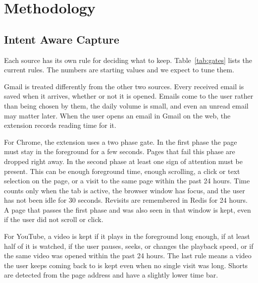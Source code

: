 \documentclass[conference]{IEEEtran}
\begin{document}
\section{Methodology}\label{sec:method}
\subsection{Intent Aware Capture}
Each source has its own rule for deciding what to keep. Table~\ref{tab:gates} lists the current rules. The numbers are starting values and we expect to tune them.

Gmail is treated differently from the other two sources. Every received email is saved when it arrives, whether or not it is opened. Emails come to the user rather than being chosen by them, the daily volume is small, and even an unread email may matter later. When the user opens an email in Gmail on the web, the extension records reading time for it.

For Chrome, the extension uses a two phase gate. In the first phase the page must stay in the foreground for a few seconds. Pages that fail this phase are dropped right away. In the second phase at least one sign of attention must be present. This can be enough foreground time, enough scrolling, a click or text selection on the page, or a visit to the same page within the past 24 hours. Time counts only when the tab is active, the browser window has focus, and the user has not been idle for 30 seconds. Revisits are remembered in Redis for 24 hours. A page that passes the first phase and was also seen in that window is kept, even if the user did not scroll or click.

For YouTube, a video is kept if it plays in the foreground long enough, if at least half of it is watched, if the user pauses, seeks, or changes the playback speed, or if the same video was opened within the past 24 hours. The last rule means a video the user keeps coming back to is kept even when no single visit was long. Shorts are detected from the page address and have a slightly lower time bar.
\end{document}
